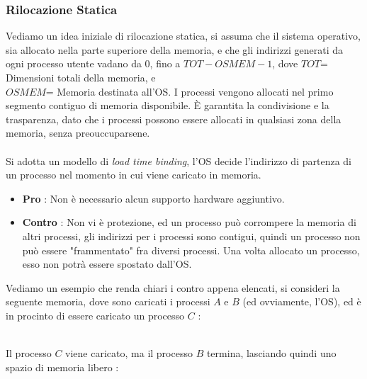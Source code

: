 \documentclass[12pt, letterpaper]{article}
\newcommand{\acc}{\\\hphantom{}\\}
\begin{document}
\subsubsection{Rilocazione Statica}
Vediamo un idea iniziale di rilocazione statica, si assuma che il sistema operativo, sia allocato nella parte superiore 
della memoria, e che gli indirizzi generati da ogni processo utente vadano da 0, fino a \(TOT-OSMEM-1\), dove \(TOT\)= Dimensioni 
totali della memoria, e \\ \(OSMEM\)= Memoria destinata all'OS. I processi vengono allocati nel primo segmento contiguo di memoria 
disponibile. È garantita la condivisione e la trasparenza, dato che i processi possono essere allocati in qualsiasi 
zona della memoria, senza preouccuparsene.\acc 
Si adotta un modello di  \textit{load time binding}, l'OS decide l'indirizzo di partenza di un processo 
nel momento in cui viene caricato in memoria. \begin{itemize}
    \item \textbf{Pro} : Non è necessario alcun supporto hardware aggiuntivo.
    \item \textbf{Contro} : Non vi è protezione, ed un processo può corrompere la memoria di altri processi, gli indirizzi 
    per i processi sono contigui, quindi un processo non può essere "frammentato" fra diversi processi. Una volta allocato un 
    processo, esso non potrà essere spostato dall'OS.
\end{itemize}
Vediamo un esempio che renda chiari i contro appena elencati, si consideri la seguente memoria, dove sono caricati 
i processi \(A\) e \(B\) (ed ovviamente, l'OS), ed è in procinto di essere caricato un processo \(C\) :
\begin{figure}[h]
\end{figure}\\
Il processo \(C\) viene caricato, ma il processo \(B\) termina, lasciando quindi uno spazio di memoria libero :
\begin{figure}[h]
\end{figure}\\
\end{document}
